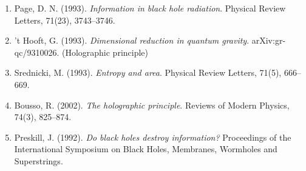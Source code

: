 \documentclass[12pt,a4paper]{article}
\begin{document}
\begin{enumerate}
\item Page, D. N. (1993). \textit{Information in black hole radiation}. Physical Review Letters, 71(23), 3743–3746.
\item 't Hooft, G. (1993). \textit{Dimensional reduction in quantum gravity}. arXiv:gr-qc/9310026. (Holographic principle)
\item Srednicki, M. (1993). \textit{Entropy and area}. Physical Review Letters, 71(5), 666–669.
\item Bousso, R. (2002). \textit{The holographic principle}. Reviews of Modern Physics, 74(3), 825–874.
\item Preskill, J. (1992). \textit{Do black holes destroy information?} Proceedings of the International Symposium on Black Holes, Membranes, Wormholes and Superstrings.
\end{enumerate}
\end{document}
